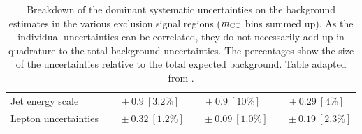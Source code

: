 \begin{table}
\begin{center}
\begin{tabular*}{\textwidth}{lccc}
Jet energy scale         & $~~~\pm 0.9\ [3.2\%] $          & $~\pm 0.9\ [10\%] $          & $~\pm 0.29\ [4\%] $       \\
Lepton uncertainties         & $~~~~~\pm 0.32\ [1.2\%] $          & $~~~~\pm 0.09\ [1.0\%] $          & $~~~~\pm 0.19\ [2.3\%] $   \\
\bottomrule
\end{tabular*}
\end{center}
\caption[Breakdown of uncertainties on background estimates]{
Breakdown of the dominant systematic uncertainties on the background estimates in the various exclusion signal regions ($m_{\textrm{CT}}$ bins summed up).
As the individual uncertainties can be correlated, they do not necessarily add up in quadrature to 
the total background uncertainties. The percentages show the size of the uncertainties relative to the total expected background. Table adapted from \cite{SUSY-2019-08}.}
\label{tab:systematics_summary}
\end{table}




